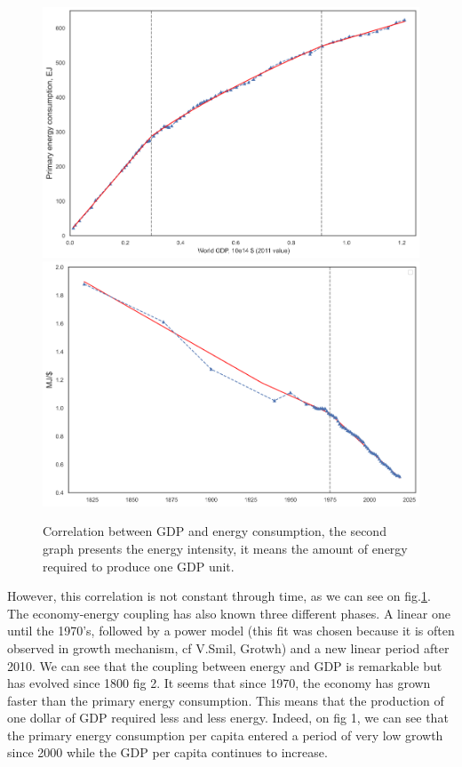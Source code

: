 \documentclass[conference]{IEEEtran}
\begin{document}
\begin{figure}
    \centering
    \includegraphics[scale=0.22]{energy-gdp.png}
    \includegraphics[scale=0.22]{energyint.png}
    \caption{Correlation between GDP and energy consumption, the second graph presents the energy intensity, it means the amount of energy required to produce one GDP unit.}
    \label{worldcorrelation}
\end{figure}
However, this correlation is not constant through time, as we can see on fig.\ref{worldcorrelation}. The economy-energy coupling has also known three different phases. A linear one until the 1970’s, followed by a power model (this fit was chosen because it is often observed in growth mechanism, cf V.Smil, Grotwh) and a new linear period after 2010.
We can see that the coupling between energy and GDP is remarkable but has evolved since 1800 fig 2. It seems that since 1970, the economy has grown faster than the primary energy consumption. This means that the production of one dollar of GDP required less and less energy. Indeed, on fig 1, we can see that the primary energy consumption per capita entered a period of very low growth since 2000 while the GDP per capita continues to increase. 
\end{document}
